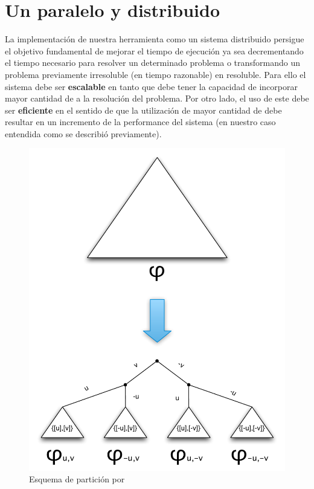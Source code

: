 

\chapter{Un \ssolver paralelo y distribuido }
\label{ssolver-pardist}

La implementación de nuestra herramienta como un sistema distribuido persigue
el objetivo fundamental de mejorar el tiempo de ejecución ya sea decrementando
el tiempo necesario para resolver un determinado problema o transformando un
problema previamente irresoluble (en tiempo razonable) en resoluble. Para ello
el sistema debe ser \textbf{escalable} en tanto que debe tener la capacidad de
incorporar mayor cantidad de \hard a la resolución del problema. Por otro
lado, el uso de este \hard debe ser \textbf{eficiente} en el sentido de que la
utilización de mayor cantidad de \hard debe resultar en un incremento de la
performance del sistema (en nuestro caso entendida como se describió
previamente).

\begin{figure}
\includegraphics[scale=0.4]{graphs/split por guiding path}
\caption{Esquema de partición por \gp}
\label{fig:guidingpaths}
\end{figure}

